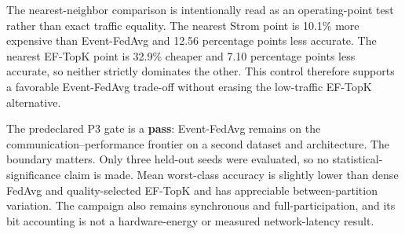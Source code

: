 The nearest-neighbor comparison is intentionally read as an operating-point
test rather than exact traffic equality. The nearest Strom point is 10.1\%
more expensive than Event-FedAvg and 12.56 percentage points less accurate.
The nearest EF-TopK point is 32.9\% cheaper and 7.10 percentage points less
accurate, so neither strictly dominates the other. This control therefore
supports a favorable Event-FedAvg trade-off without erasing the low-traffic
EF-TopK alternative.

The predeclared P3 gate is a \textbf{pass}: Event-FedAvg remains on the
communication--performance frontier on a second dataset and architecture.
The boundary matters. Only three held-out seeds were evaluated, so no
statistical-significance claim is made. Mean worst-class accuracy is slightly
lower than dense FedAvg and quality-selected EF-TopK and has appreciable
between-partition variation. The campaign also remains synchronous and
full-participation, and its bit accounting is not a hardware-energy or measured
network-latency result.
